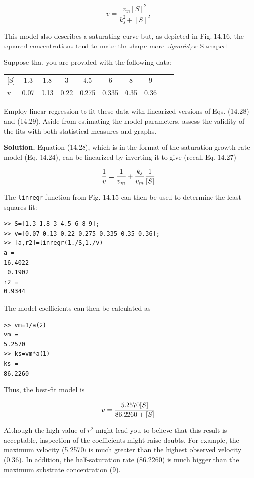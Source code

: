 \documentclass[../main.tex]{subfiles}
\begin{document}
\begin{equation}
	\tag{14.29}
	v = \frac{v_m {[S]}^2}{k^2_s + {[S]}^2}
\end{equation}

\noindent This model also describes a saturating curve but, as depicted in Fig. 14.16, the squared concentrations tend to make the shape more \textit{sigmoid},or S-shaped.

Suppose that you are provided with the following data:

\begin{tabular}{l c c c c c c c c c}
	[S] &1.3 & 1.8 & 3  &  4.5  & 6  &   8   & 9 \\
	v  & 0.07 &0.13 &0.22 &0.275& 0.335& 0.35 &0.36
\end{tabular}

\noindent Employ linear regression to fit these data with linearized versions of Eqs. (14.28) and (14.29). Aside from estimating the model parameters, assess the validity of the fits with both statistical measures and graphs.

\textbf{Solution.} Equation (14.28), which is in the format of the saturation-growth-rate model (Eq. 14.24), can be linearized by inverting it to give (recall Eq. 14.27)

\begin{equation}
	\notag
	\frac{1}{v} = \frac{1}{v_m} + \frac{k_s}{v_m} \frac{1}{[S]}
\end{equation}

\noindent The \texttt{linregr} function from Fig. 14.15 can then be used to determine the least-squares fit:

\begin{lstlisting}[numbers=none] 
>> S=[1.3 1.8 3 4.5 6 8 9];
>> v=[0.07 0.13 0.22 0.275 0.335 0.35 0.36];
>> [a,r2]=linregr(1./S,1./v)
a =
16.4022
 0.1902
r2 =
0.9344
\end{lstlisting}

\noindent The model coefficients can then be calculated as

\begin{lstlisting}[numbers=none] 
>> vm=1/a(2)
vm =
5.2570
>> ks=vm*a(1)
ks =
86.2260
\end{lstlisting}

\noindent Thus, the best-fit model is

\begin{equation}
	\notag
	v = \frac{5.2570[S]}{86.2260 + [S]}
\end{equation}

Although the high value of $r^2$ might lead you to believe that this result is acceptable, inspection of the coefficients might raise doubts. For example, the maximum velocity (5.2570) is much greater than the highest observed velocity (0.36). In addition, the half-saturation rate (86.2260) is much bigger than the maximum substrate concentration (9).
\end{document}
